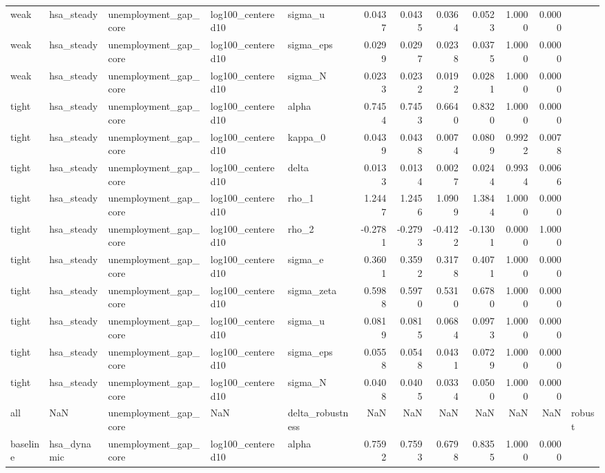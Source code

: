 \begin{tabular}{lllllrrrrrrl}
weak & hsa\_steady & unemployment\_gap\_core & log100\_centered10 & sigma\_u & 0.0437 & 0.0435 & 0.0364 & 0.0523 & 1.0000 & 0.0000 &  \\
weak & hsa\_steady & unemployment\_gap\_core & log100\_centered10 & sigma\_eps & 0.0299 & 0.0297 & 0.0238 & 0.0375 & 1.0000 & 0.0000 &  \\
weak & hsa\_steady & unemployment\_gap\_core & log100\_centered10 & sigma\_N & 0.0233 & 0.0232 & 0.0192 & 0.0281 & 1.0000 & 0.0000 &  \\
tight & hsa\_steady & unemployment\_gap\_core & log100\_centered10 & alpha & 0.7454 & 0.7453 & 0.6640 & 0.8320 & 1.0000 & 0.0000 &  \\
tight & hsa\_steady & unemployment\_gap\_core & log100\_centered10 & kappa\_0 & 0.0439 & 0.0438 & 0.0074 & 0.0809 & 0.9922 & 0.0078 &  \\
tight & hsa\_steady & unemployment\_gap\_core & log100\_centered10 & delta & 0.0133 & 0.0134 & 0.0027 & 0.0244 & 0.9934 & 0.0066 &  \\
tight & hsa\_steady & unemployment\_gap\_core & log100\_centered10 & rho\_1 & 1.2447 & 1.2456 & 1.0909 & 1.3844 & 1.0000 & 0.0000 &  \\
tight & hsa\_steady & unemployment\_gap\_core & log100\_centered10 & rho\_2 & -0.2781 & -0.2793 & -0.4122 & -0.1301 & 0.0000 & 1.0000 &  \\
tight & hsa\_steady & unemployment\_gap\_core & log100\_centered10 & sigma\_e & 0.3601 & 0.3592 & 0.3178 & 0.4071 & 1.0000 & 0.0000 &  \\
tight & hsa\_steady & unemployment\_gap\_core & log100\_centered10 & sigma\_zeta & 0.5988 & 0.5970 & 0.5310 & 0.6780 & 1.0000 & 0.0000 &  \\
tight & hsa\_steady & unemployment\_gap\_core & log100\_centered10 & sigma\_u & 0.0819 & 0.0815 & 0.0684 & 0.0973 & 1.0000 & 0.0000 &  \\
tight & hsa\_steady & unemployment\_gap\_core & log100\_centered10 & sigma\_eps & 0.0558 & 0.0548 & 0.0431 & 0.0729 & 1.0000 & 0.0000 &  \\
tight & hsa\_steady & unemployment\_gap\_core & log100\_centered10 & sigma\_N & 0.0408 & 0.0405 & 0.0334 & 0.0500 & 1.0000 & 0.0000 &  \\
all & NaN & unemployment\_gap\_core & NaN & delta\_robustness & NaN & NaN & NaN & NaN & NaN & NaN & robust \\
baseline & hsa\_dynamic & unemployment\_gap\_core & log100\_centered10 & alpha & 0.7592 & 0.7593 & 0.6798 & 0.8355 & 1.0000 & 0.0000 &  \\

\end{tabular}
